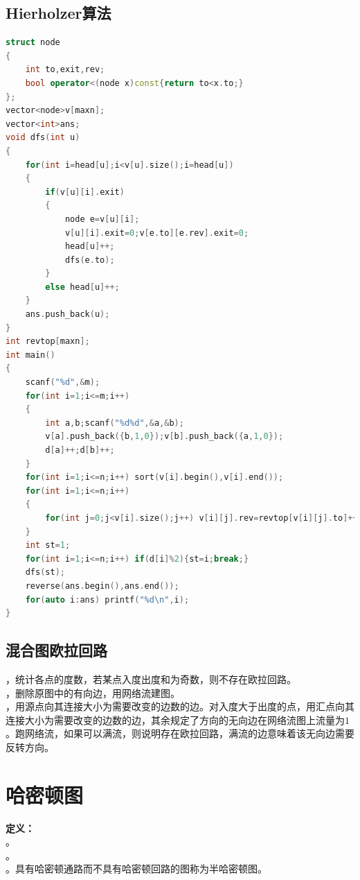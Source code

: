 \documentclass[a4paper]{book}
\begin{document}
\subsection{Hierholzer算法}
\begin{lstlisting}[language=c++,title=无向图欧拉回路字典序最小输出方案]
struct node
{
    int to,exit,rev;
    bool operator<(node x)const{return to<x.to;}
};
vector<node>v[maxn];
vector<int>ans;
void dfs(int u)
{
    for(int i=head[u];i<v[u].size();i=head[u])
    {
        if(v[u][i].exit)
        {
            node e=v[u][i];
            v[u][i].exit=0;v[e.to][e.rev].exit=0;
            head[u]++;
            dfs(e.to);
        }
        else head[u]++;
    }
    ans.push_back(u);
}
int revtop[maxn];
int main()
{
    scanf("%d",&m);
    for(int i=1;i<=m;i++)
    {
        int a,b;scanf("%d%d",&a,&b);
        v[a].push_back({b,1,0});v[b].push_back({a,1,0});
        d[a]++;d[b]++;
    }
    for(int i=1;i<=n;i++) sort(v[i].begin(),v[i].end());
    for(int i=1;i<=n;i++) 
    {
        for(int j=0;j<v[i].size();j++) v[i][j].rev=revtop[v[i][j].to]++;
    }
    int st=1;
    for(int i=1;i<=n;i++) if(d[i]%2){st=i;break;}
    dfs(st);
    reverse(ans.begin(),ans.end());
    for(auto i:ans) printf("%d\n",i);
}
\end{lstlisting}
\subsection{混合图欧拉回路}
，统计各点的度数，若某点入度出度和为奇数，则不存在欧拉回路。\\
，删除原图中的有向边，用网络流建图。\\
，用源点向其连接大小为需要改变的边数的边。对入度大于出度的点，用汇点向其连接大小为需要改变的边数的边，其余规定了方向的无向边在网络流图上流量为$1$。跑网络流，如果可以满流，则说明存在欧拉回路，满流的边意味着该无向边需要反转方向。
\section{哈密顿图}
\noindent\textbf{定义：}\\
。\\
。\\
。具有哈密顿通路而不具有哈密顿回路的图称为半哈密顿图。
\end{document}
